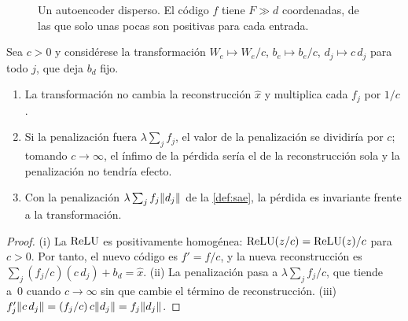 \begin{figure}[h]
\centering
{}
\caption{Un autoencoder disperso. El código $f$ tiene $F\gg d$ coordenadas, de las que solo unas pocas son positivas para cada entrada.}
\label{fig:sae}
\end{figure}

\begin{proposicion}\label{prop:escala}
Sea $c>0$ y considérese la transformación $W_e\mapsto W_e/c$, $b_e\mapsto b_e/c$, $d_j\mapsto c\,d_j$ para todo $j$, que deja $b_d$ fijo.
\begin{enumerate}
  \item La transformación no cambia la reconstrucción $\hat x$ y multiplica cada $f_j$ por $1/c$.
  \item Si la penalización fuera $\lambda\sum_jf_j$, el valor de la penalización se dividiría por $c$; tomando $c\to\infty$, el ínfimo de la pérdida sería el de la reconstrucción sola y la penalización no tendría efecto.
  \item Con la penalización $\lambda\sum_jf_j\lVert d_j\rVert$ de la \cref{def:sae}, la pérdida es invariante frente a la transformación.
\end{enumerate}
\end{proposicion}

\begin{proof}
(i) La $\operatorname{ReLU}$ es positivamente homogénea: $\operatorname{ReLU}(z/c)=\operatorname{ReLU}(z)/c$ para $c>0$. Por tanto, el nuevo código es $f'=f/c$, y la nueva reconstrucción es $\sum_j(f_j/c)(c\,d_j)+b_d=\hat x$. (ii) La penalización pasa a $\lambda\sum_jf_j/c$, que tiende a~0 cuando $c\to\infty$ sin que cambie el término de reconstrucción. (iii) $f'_j\lVert c\,d_j\rVert=(f_j/c)\,c\lVert d_j\rVert=f_j\lVert d_j\rVert$.
\end{proof}

